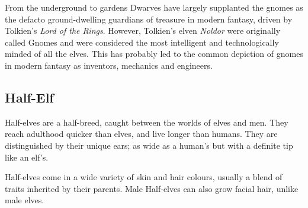 \documentclass[10pt,twoside]{article}
\begin{document}
\begin{multicols}{2}
\begin{commentbox}{From the underground to gardens}
Dwarves have largely supplanted the gnomes as the defacto ground-dwelling guardians of treasure in modern fantasy, driven by Tolkien's \textit{Lord of the Rings}. However, Tolkien's elven \textit{Noldor} were originally called Gnomes and were considered the most intelligent and technologically minded of all the elves. This has probably led to the common depiction of gnomes in modern fantasy as inventors, mechanics and engineers.

\end{commentbox}


\end{multicols}

\newpage


\subsection{Half-Elf}

Half-elves are a half-breed, caught between the worlds of elves and men. They reach adulthood quicker than elves, and live longer than humans. They are distinguished by their unique ears; as wide as a human's but with a definite tip like an elf's.

Half-elves come in a wide variety of skin and hair colours, usually a blend of traits inherited by their parents. Male Half-elves can also grow facial hair, unlike male elves.
\end{document}
